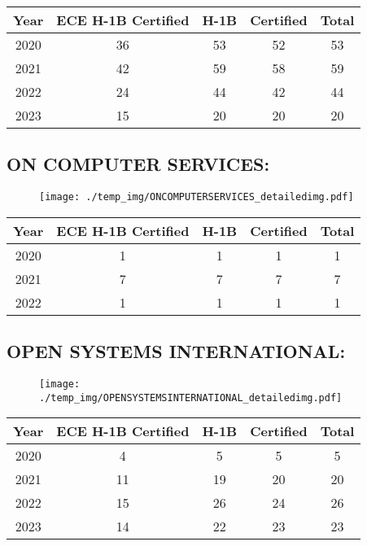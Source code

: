 \documentclass{article}%
\begin{document}
%
\begin{longtable}{c|c|c|c|c}%
\hline%
Year&ECE H{-}1B Certified&H{-}1B&Certified&Total\\%
\hline%
2020&36&53&52&53\\%
\hline%
2021&42&59&58&59\\%
\hline%
2022&24&44&42&44\\%
\hline%
2023&15&20&20&20\\%
\hline%
\end{longtable}

%
\newpage%
\subsection{ON COMPUTER SERVICES:}%
\label{subsec:ONCOMPUTERSERVICES}%
\label{ONCOMPUTERSERVICESdetailed}%


\begin{figure}[htbp]%
\centering%
\texttt{[image: ./temp\_img/ONCOMPUTERSERVICES\_detailedimg.pdf]}%
\end{figure}

%
\begin{longtable}{c|c|c|c|c}%
\hline%
Year&ECE H{-}1B Certified&H{-}1B&Certified&Total\\%
\hline%
2020&1&1&1&1\\%
\hline%
2021&7&7&7&7\\%
\hline%
2022&1&1&1&1\\%
\hline%
\end{longtable}

%
\newpage%
\subsection{OPEN SYSTEMS INTERNATIONAL:}%
\label{subsec:OPENSYSTEMSINTERNATIONAL}%
\label{OPENSYSTEMSINTERNATIONALdetailed}%


\begin{figure}[htbp]%
\centering%
\texttt{[image: ./temp\_img/OPENSYSTEMSINTERNATIONAL\_detailedimg.pdf]}%
\end{figure}

%
\begin{longtable}{c|c|c|c|c}%
\hline%
Year&ECE H{-}1B Certified&H{-}1B&Certified&Total\\%
\hline%
2020&4&5&5&5\\%
\hline%
2021&11&19&20&20\\%
\hline%
2022&15&26&24&26\\%
\hline%
2023&14&22&23&23\\%
\hline%
\end{longtable}
\end{document}
